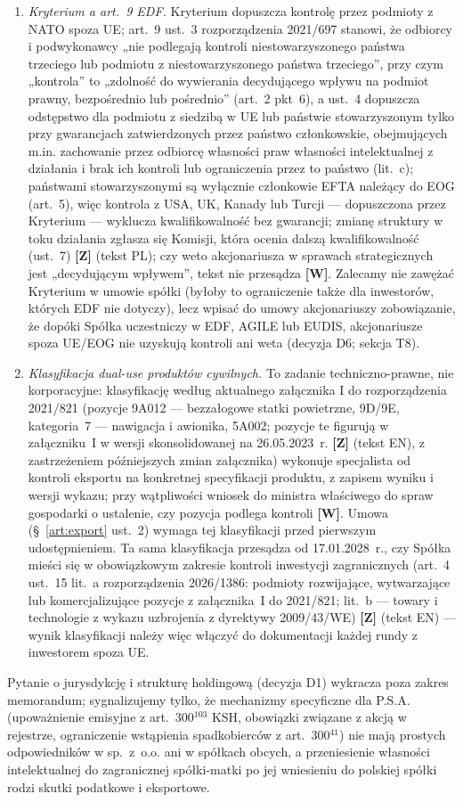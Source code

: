 \documentclass[12pt,a4paper]{report}
\newcommand{\Wiar}[1]{\textbf{[#1]}}
\begin{document}
\begin{enumerate}
  \item \emph{Kryterium a art.~9 EDF.} Kryterium dopuszcza kontrolę przez podmioty z NATO spoza UE; art.~9 ust.~3 rozporządzenia 2021/697 stanowi, że odbiorcy i podwykonawcy „nie podlegają kontroli niestowarzyszonego państwa trzeciego lub podmiotu z niestowarzyszonego państwa trzeciego”, przy czym „kontrola” to „zdolność do wywierania decydującego wpływu na podmiot prawny, bezpośrednio lub pośrednio” (art.~2 pkt~6), a ust.~4 dopuszcza odstępstwo dla podmiotu z siedzibą w UE lub państwie stowarzyszonym tylko przy gwarancjach zatwierdzonych przez państwo członkowskie, obejmujących m.in. zachowanie przez odbiorcę własności praw własności intelektualnej z działania i brak ich kontroli lub ograniczenia przez to państwo (lit.~c); państwami stowarzyszonymi są wyłącznie członkowie EFTA należący do EOG (art.~5), więc kontrola z USA, UK, Kanady lub Turcji --- dopuszczona przez Kryterium --- wyklucza kwalifikowalność bez gwarancji; zmianę struktury w toku działania zgłasza się Komisji, która ocenia dalszą kwalifikowalność (ust.~7) \Wiar{Z} (tekst PL); czy weto akcjonariusza w sprawach strategicznych jest „decydującym wpływem”, tekst nie przesądza \Wiar{W}. Zalecamy nie zawężać Kryterium w umowie spółki (byłoby to ograniczenie także dla inwestorów, których EDF nie dotyczy), lecz wpisać do umowy akcjonariuszy zobowiązanie, że dopóki Spółka uczestniczy w EDF, AGILE lub EUDIS, akcjonariusze spoza UE/EOG nie uzyskują kontroli ani weta (decyzja D6; sekcja T8).
  \item \emph{Klasyfikacja dual-use produktów cywilnych.} To zadanie techniczno-prawne, nie korporacyjne: klasyfikację według aktualnego załącznika I do rozporządzenia 2021/821 (pozycje 9A012 --- bezzałogowe statki powietrzne, 9D/9E, kategoria~7 --- nawigacja i awionika, 5A002; pozycje te figurują w załączniku~I w wersji skonsolidowanej na 26.05.2023~r. \Wiar{Z} (tekst EN), z zastrzeżeniem późniejszych zmian załącznika) wykonuje specjalista od kontroli eksportu na konkretnej specyfikacji produktu, z zapisem wyniku i wersji wykazu; przy wątpliwości wniosek do ministra właściwego do spraw gospodarki o ustalenie, czy pozycja podlega kontroli \Wiar{W}. Umowa (§~\ref{art:export} ust.~2) wymaga tej klasyfikacji przed pierwszym udostępnieniem. Ta sama klasyfikacja przesądza od 17.01.2028~r., czy Spółka mieści się w obowiązkowym zakresie kontroli inwestycji zagranicznych (art.~4 ust.~15 lit.~a rozporządzenia 2026/1386: podmioty rozwijające, wytwarzające lub komercjalizujące pozycje z załącznika~I do 2021/821; lit.~b --- towary i technologie z wykazu uzbrojenia z dyrektywy 2009/43/WE) \Wiar{Z} (tekst EN) --- wynik klasyfikacji należy więc włączyć do dokumentacji każdej rundy z inwestorem spoza UE.
\end{enumerate}
Pytanie o jurysdykcję i strukturę holdingową (decyzja D1) wykracza poza zakres memorandum; sygnalizujemy tylko, że mechanizmy specyficzne dla P.S.A. (upoważnienie emisyjne z art.~300$^{103}$ KSH, obowiązki związane z akcją w rejestrze, ograniczenie wstąpienia spadkobierców z art.~300$^{41}$) nie mają prostych odpowiedników w sp.~z~o.o. ani w spółkach obcych, a przeniesienie własności intelektualnej do zagranicznej spółki-matki po jej wniesieniu do polskiej spółki rodzi skutki podatkowe i eksportowe.
\end{document}

